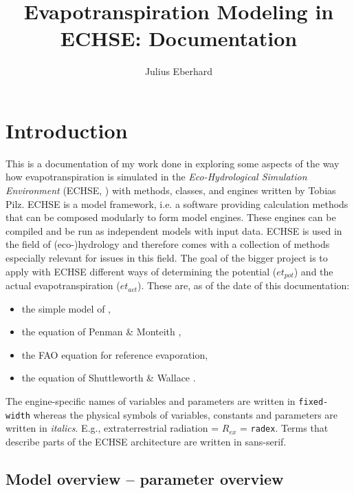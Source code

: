 \documentclass{scrreprt}
\title{Evapotranspiration Modeling in ECHSE: Documentation}
\author{Julius Eberhard}
\begin{document}
\maketitle
\tableofcontents


\chapter{Introduction} \label{ch:introduction}

This is a documentation of my work done in exploring some aspects of the way how evapotranspiration is simulated in the \emph{Eco-Hydrological Simulation Environment} (ECHSE, \citealt{kneis15}) with methods, classes, and engines written by Tobias Pilz.
ECHSE is a model framework, i.e. a software providing calculation methods that can be composed modularly to form model engines. These engines can be compiled and be run as independent models with input data.
ECHSE is used in the field of (eco-)hydrology and therefore comes with a collection of methods especially relevant for issues in this field.
The goal of the bigger project is to apply with ECHSE different ways of determining the potential ($et_{pot}$) and the actual evapotranspiration ($et_{act}$).
These are, as of the date of this documentation:
\begin{itemize}
  \item the simple model of \citet{makkink57},
  \item the equation of Penman \& Monteith \citep{monteith65},
  \item the FAO equation for reference evaporation,
  \item the equation of Shuttleworth \& Wallace \citep{shuttleworth85}.
\end{itemize}

The engine-specific names of variables and parameters are written in \verb!fixed-width! whereas the physical symbols of variables, constants and parameters are written in \textit{italics}.
E.g., extraterrestrial radiation = $R_{ex}$ = \verb!radex!.
Terms that describe parts of the ECHSE architecture are written in \textsf{sans-serif}.

\section{Model overview -- parameter overview} \label{sec:intro_overview}
\end{document}
